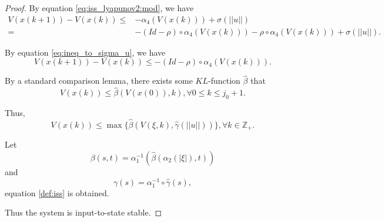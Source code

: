 \begin{proof}
By equation \eqref{eq:iss_lyapunov2:mod}, we have
\begin{equation}
\begin{aligned}
V( x(k + 1) ) - V( x( k ) ) \leq & - \alpha_{4} ( V ( x( k ) ) ) + \sigma ( || u || ) \\
= & - ( Id - \rho ) \circ \alpha_{4} ( V ( x( k ) ) ) - \rho \circ \alpha_{4} ( V ( x( k ) ) ) + \sigma ( || u || ).
\end{aligned}
\end{equation} 

By equation \eqref{eq:ineq_to_sigma_u}, we have
\begin{equation}
V( x(k + 1) ) - V( x( k ) ) \leq - ( Id - \rho ) \circ \alpha_{4} ( V ( x( k ) ) ).
\end{equation}

By a standard comparison lemma, there exists some $ KL $-function $ \hat{\beta} $ that 
\begin{equation}
V( x( k ) ) \leq \hat{\beta}( V( x(0) ), k  ), \forall 0 \leq k \leq j_{0} + 1.
\end{equation}

Thus, 
\begin{equation}
V( x ( k ) ) \leq \max \{ \hat{ \beta } ( V( \xi , k ), \hat{ \gamma } ( || u || ) ) \}, \forall k \in \mathbb{Z}_{+}.
\end{equation}

Let 
\begin{equation}
\beta(s, t) = \alpha_{1}^{-1} ( \hat{ \beta } ( \alpha_{2} ( | \xi | ) , t  ) )
\end{equation}
and
\begin{equation}
\gamma (s) = \alpha_{1}^{-1} \circ \hat{ \gamma } (s),
\end{equation}
equation \eqref{def:iss} is obtained.

Thus the system is input-to-state stable.

\end{proof}